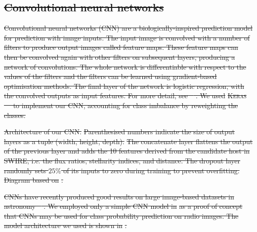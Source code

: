 \documentclass[11pt, a4paper]{book}
\providecommand{\DIFdeltex}[1]{{\protect\color{red}\sout{#1}}}                      %
\providecommand{\DIFdelFL}[1]{\DIFdel{#1}} %
\providecommand{\DIFdel}[1]{\texorpdfstring{\DIFdeltex{#1}}{}} %
\begin{document}
\subsection{\DIFdel{Convolutional neural networks}}
\addtocounter{subsection}{-1}%

\DIFdel{Convolutional neural networks (CNN) are a biologically-inspired prediction
    model for prediction with image inputs. The input image is convolved with
    a number of filters to produce output images called feature maps. These
    feature maps can then be convolved again with other filters on subsequent
    layers, producing a network of convolutions. The whole network is
    differentiable with respect to the values of the filters and the filters
    can be learned using gradient-based optimisation methods. The final layer
    of the network is logistic regression, with the convolved outputs as input
    features. For more detail, see \mbox{%
\citet[subsection II.A][]{lecun98}}\hspace{0pt}%
. We used
    }\textsc{\DIFdel{Keras}} %
\DIFdel{\mbox{%
\citep{chollet15keras} }\hspace{0pt}%
to implement our CNN, accounting for
    class imbalance by reweighting the classes.
}%

{%
\DIFdelFL{Architecture of our CNN. }%
\DIFdelFL{Parenthesised numbers indicate
      the size of output layers as a tuple (width, height, depth).}%
\DIFdelFL{The
      concatenate layer flattens the output of the previous layer and adds the
      10 features derived from the candidate host in SWIRE, i.e. the flux
      ratios, stellarity indices, and distance. The dropout layer randomly
      sets $25\%$ of its inputs to zero during training to prevent
      overfitting. Diagram based on }%
\DIFdelFL{.}}

\DIFdel{CNNs have recently produced good results on large image-based datasets in
    astronomy \mbox{%
\citep[e.g.]{lukic18compact, dieleman15cnn}}\hspace{0pt}%
. We employed
    only a simple CNN model in }%
\DIFdel{as a proof of concept that CNNs may
    be used for class probability prediction on radio images. The model
    architecture we used is shown in }%
\DIFdel{.
}%
\end{document}
